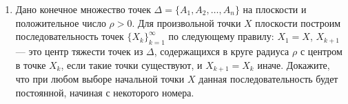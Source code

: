 \documentclass[12pt, a4paper]{article}
\begin{document}
\begin{enumerate}
\item Дано конечное множество точек $\Delta = \{ A_1, A_2, \hdots, A_n \}$ на плоскости и положительное число $\rho > 0$. Для произвольной точки $X$ плоскости построим последовательность точек $\{X_k\}_{k=1}^{\infty}$ по следующему правилу: $X_1 = X$, $X_{k+1}$ --- это центр тяжести точек из $\Delta$, содержащихся в круге радиуса $\rho$ с центром в точке $X_k$, если такие точки существуют, и $X_{k+1} = X_k$ иначе. Докажите, что при любом выборе начальной точки $X$ данная последовательность будет постоянной, начиная с некоторого номера.

\end{enumerate}
\end{document}
